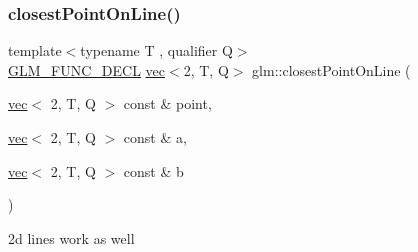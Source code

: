 \subsubsection{\texorpdfstring{closest\+Point\+On\+Line()}{closestPointOnLine()}\hspace{0.1cm}{\footnotesize\ttfamily [2/2]}}
{\footnotesize\ttfamily template$<$typename T , qualifier Q$>$ \\
\hyperlink{setup_8hpp_ab2d052de21a70539923e9bcbf6e83a51}{G\+L\+M\+\_\+\+F\+U\+N\+C\+\_\+\+D\+E\+CL} \hyperlink{structglm_1_1vec}{vec}$<$2, T, Q$>$ glm\+::closest\+Point\+On\+Line (\begin{DoxyParamCaption}\item[{\hyperlink{structglm_1_1vec}{vec}$<$ 2, T, Q $>$ const \&}]{point,  }\item[{\hyperlink{structglm_1_1vec}{vec}$<$ 2, T, Q $>$ const \&}]{a,  }\item[{\hyperlink{structglm_1_1vec}{vec}$<$ 2, T, Q $>$ const \&}]{b }\end{DoxyParamCaption})}



2d lines work as well 

